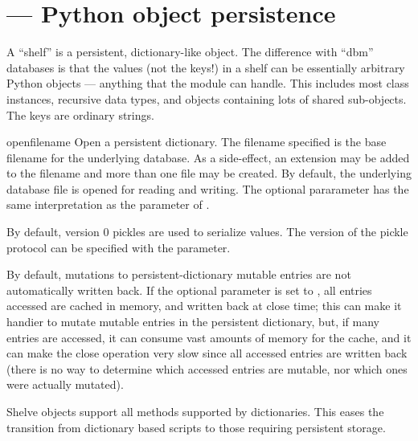 \section{ ---
         Python object persistence}



A ``shelf'' is a persistent, dictionary-like object.  The difference
with ``dbm'' databases is that the values (not the keys!) in a shelf
can be essentially arbitrary Python objects --- anything that the
 module can handle.  This includes most class
instances, recursive data types, and objects containing lots of shared 
sub-objects.  The keys are ordinary strings.

\begin{funcdesc}{open}{filename}
Open a persistent dictionary.  The filename specified is the base filename
for the underlying database.  As a side-effect, an extension may be added to
the filename and more than one file may be created.  By default, the
underlying database file is opened for reading and writing.  The optional
{} pararameter has the same interpretation as the 
parameter of .  

By default, version 0 pickles are used to serialize values. 
The version of the pickle protocol can be specified with the
 parameter. 

By default, mutations to persistent-dictionary mutable entries are not
automatically written back.  If the optional  parameter
is set to {}, all entries accessed are cached in memory, and
written back at close time; this can make it handier to mutate mutable
entries in the persistent dictionary, but, if many entries are
accessed, it can consume vast amounts of memory for the cache, and it
can make the close operation very slow since all accessed entries are
written back (there is no way to determine which accessed entries are
mutable, nor which ones were actually mutated).

\end{funcdesc}

Shelve objects support all methods supported by dictionaries.  This eases
the transition from dictionary based scripts to those requiring persistent
storage.

